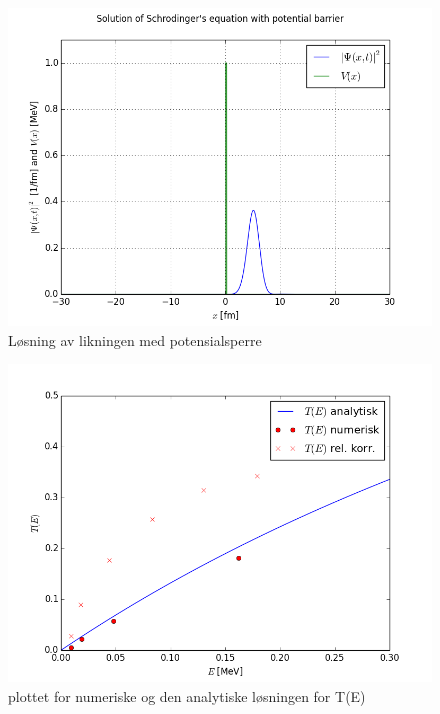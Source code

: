 \documentclass[norsk,a4paper,12pt]{article}
\begin{document}
\begin{figure}
\includegraphics[scale=0.7]{2b.png}
\caption{Løsning av likningen med potensialsperre}
\label{fig:2b}
\end{figure}


\begin{figure}
\includegraphics[scale=0.7]{2c1.png}
\caption{plottet for numeriske og den analytiske løsningen for T(E)}
\label{fig:2c1}
\end{figure}
\end{document}
